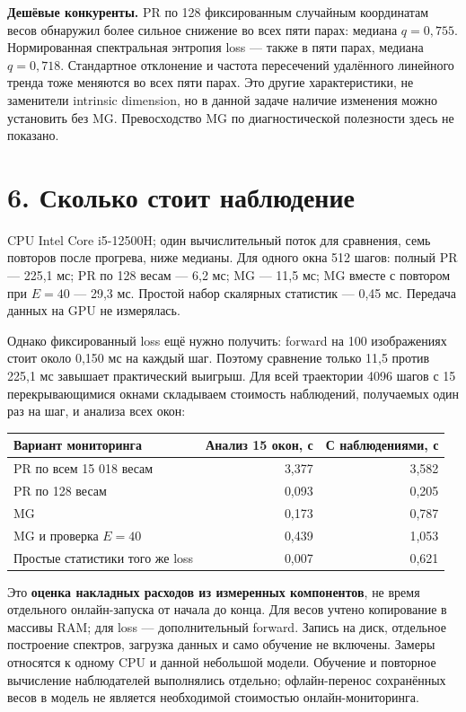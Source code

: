 \documentclass[10pt,a4paper]{article}
\begin{document}
\textbf{Дешёвые конкуренты.} PR по 128 фиксированным случайным координатам весов обнаружил более сильное снижение во всех пяти парах: медиана $q=0,755$. Нормированная спектральная энтропия loss --- также в пяти парах, медиана $q=0,718$. Стандартное отклонение и частота пересечений удалённого линейного тренда тоже меняются во всех пяти парах. Это другие характеристики, не заменители intrinsic dimension, но в данной задаче наличие изменения можно установить без MG. Превосходство MG по диагностической полезности здесь не показано.

\newpage

\section*{6. Сколько стоит наблюдение}

CPU Intel Core i5-12500H; один вычислительный поток для сравнения, семь повторов после прогрева, ниже медианы. Для одного окна 512 шагов: полный PR --- 225,1 мс; PR по 128 весам --- 6,2 мс; MG --- 11,5 мс; MG вместе с повтором при $E=40$ --- 29,3 мс. Простой набор скалярных статистик --- 0,45 мс. Передача данных на GPU не измерялась.

Однако фиксированный loss ещё нужно получить: forward на 100 изображениях стоит около 0,150 мс на каждый шаг. Поэтому сравнение только 11,5 против 225,1 мс завышает практический выигрыш. Для всей траектории 4096 шагов с 15 перекрывающимися окнами складываем стоимость наблюдений, получаемых один раз на шаг, и анализа всех окон:

\begin{center}\small
\begin{tabularx}{\linewidth}{>{\raggedright\arraybackslash}Xrr}
\toprule
Вариант мониторинга & Анализ 15 окон, с & С наблюдениями, с \\
\midrule
PR по всем 15 018 весам & 3,377 & 3,582 \\
PR по 128 весам & 0,093 & 0,205 \\
MG & 0,173 & 0,787 \\
MG и проверка $E=40$ & 0,439 & 1,053 \\
Простые статистики того же loss & 0,007 & 0,621 \\
\bottomrule\end{tabularx}\end{center}

Это \textbf{оценка накладных расходов из измеренных компонентов}, не время отдельного онлайн-запуска от начала до конца. Для весов учтено копирование в массивы RAM; для loss --- дополнительный forward. Запись на диск, отдельное построение спектров, загрузка данных и само обучение не включены. Замеры относятся к одному CPU и данной небольшой модели. Обучение и повторное вычисление наблюдателей выполнялись отдельно; офлайн-перенос сохранённых весов в модель не является необходимой стоимостью онлайн-мониторинга.
\end{document}
